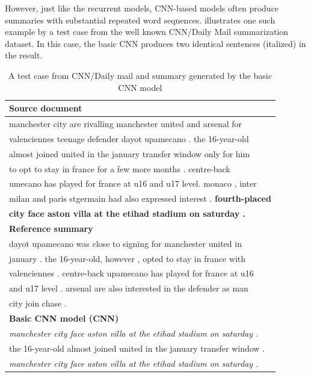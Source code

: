 However, just like the recurrent models, CNN-based models often produce
summaries with substantial repeated word sequences.
 illustrates one such example by a
test case from the well known CNN/Daily Mail summarization dataset. 
In this case, the basic CNN produces two 
identical sentences (italized) in the result. 

\begin{table}[th]
\begin{center}
\scriptsize
\begin{tabular}{|l|}%
\hline \bf Source document \\
\hline manchester city are rivalling manchester united and arsenal for \\
       valenciennes teenage defender dayot upamecano . the 16-year-old \\
	   almost joined united in the january transfer window only for him \\
	   to opt to stay in france for a few more months . centre-back \\
	   umecano has played for france at u16 and u17 level. monaco , inter \\
	   milan and paris stgermain had also expressed interest . \textbf{fourth-placed} \\
	   \textbf{city face aston villa at the etihad stadium on saturday .} \\
\hline \bf Reference summary \\
\hline dayot upamecano was close to signing for manchester united in \\
       january . the 16-year-old, however , opted to stay in france with \\
	   valenciennes . centre-back upamecano has played for france at u16 \\
	   and u17 level . arsenal are also interested in the defender as man \\
	   city join chase . \\
\hline \bf Basic CNN model (CNN) \\
\hline \textit{manchester city face aston villa at the etihad stadium on saturday .}\\
       the 16-year-old almost joined united in the january transfer window . \\
	   \textit{manchester city face aston villa at the etihad stadium on saturday .}\\
\hline
\end{tabular}
\end{center}
\caption{\label{tab:example} A test case from CNN/Daily mail 
and summary generated by the basic CNN model}
\end{table}



